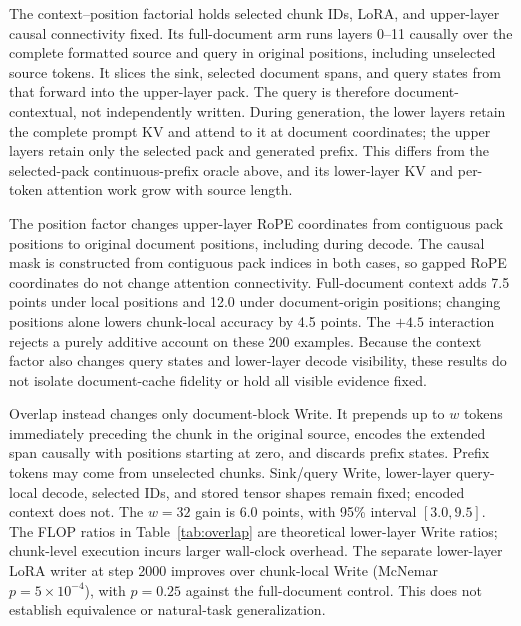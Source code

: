 The context--position factorial holds selected chunk IDs, LoRA, and upper-layer causal connectivity fixed. Its full-document arm runs layers 0--11 causally over the complete formatted source and query in original positions, including unselected source tokens. It slices the sink, selected document spans, and query states from that forward into the upper-layer pack. The query is therefore document-contextual, not independently written. During generation, the lower layers retain the complete prompt KV and attend to it at document coordinates; the upper layers retain only the selected pack and generated prefix. This differs from the selected-pack continuous-prefix oracle above, and its lower-layer KV and per-token attention work grow with source length.

The position factor changes upper-layer RoPE coordinates from contiguous pack positions to original document positions, including during decode. The causal mask is constructed from contiguous pack indices in both cases, so gapped RoPE coordinates do not change attention connectivity. Full-document context adds 7.5 points under local positions and 12.0 under document-origin positions; changing positions alone lowers chunk-local accuracy by 4.5 points. The $+4.5$ interaction rejects a purely additive account on these 200 examples. Because the context factor also changes query states and lower-layer decode visibility, these results do not isolate document-cache fidelity or hold all visible evidence fixed.

Overlap instead changes only document-block Write. It prepends up to $w$ tokens immediately preceding the chunk in the original source, encodes the extended span causally with positions starting at zero, and discards prefix states. Prefix tokens may come from unselected chunks. Sink/query Write, lower-layer query-local decode, selected IDs, and stored tensor shapes remain fixed; encoded context does not. The $w=32$ gain is 6.0 points, with 95\% interval $[3.0,9.5]$. The FLOP ratios in Table~\ref{tab:overlap} are theoretical lower-layer Write ratios; chunk-level execution incurs larger wall-clock overhead. The separate lower-layer LoRA writer at step 2000 improves over chunk-local Write (McNemar $p=5\times10^{-4}$), with $p=0.25$ against the full-document control. This does not establish equivalence or natural-task generalization.

